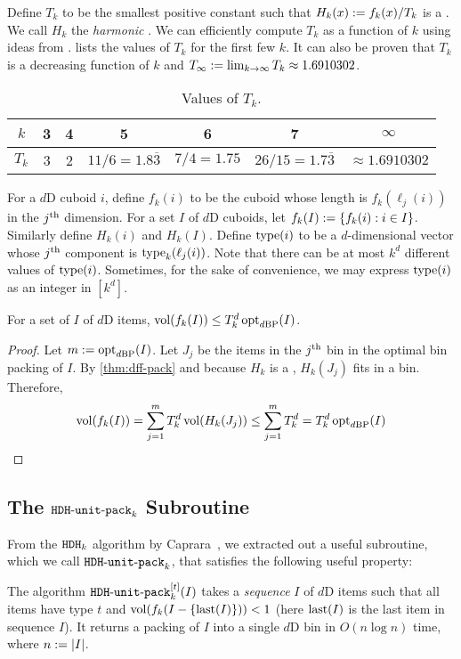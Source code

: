 Define $T_k$ to be the smallest positive constant such that
$H_k(x) := f_k(x)/T_k$ is a \dff{}. We call $H_k$ the \emph{harmonic \dff}.
We can efficiently compute $T_k$ as a function of $k$ using ideas from \cite{leelee,eku-harmonic}.
 lists the values of $T_k$ for the first few $k$.
It can also be proven that $T_k$ is a decreasing function of $k$
and $T_{\infty} := \lim_{k \to \infty} T_k \approx 1.6910302$.

\begin{table}[!ht]
\centering
\begin{tabular}{|c|c|c|c|c|c|c|}
\hline
$k$ & 3 & 4 & 5 & 6 & 7 & $\infty$ \\
\hline
$T_k$ & 3 & 2 & $11/6 = 1.8\overline{3}$ & $7/4 = 1.75$
& $26/15 = 1.7\overline{3}$ & $\approx 1.6910302$ \\
\hline
\end{tabular}
\caption{Values of $T_k$.}
\label{table:tk-values}
\end{table}

For a $d$D cuboid $i$, define $f_k(i)$ to be the cuboid
whose length is $f_k(\ell_j(i))$ in the $j^{\textrm{th}}$ dimension.
For a set $I$ of $d$D cuboids, let $f_k(I) := \{f_k(i): i \in I\}$.
Similarly define $H_k(i)$ and $H_k(I)$.
Define $\operatorname{type}(i)$ to be a $d$-dimensional vector whose $j^{\textrm{th}}$ component is $\operatorname{type}_k(\ell_j(i))$.
Note that there can be at most $k^d$ different values of $\operatorname{type}(i)$.
Sometimes, for the sake of convenience, we may express $\operatorname{type}(i)$ as an integer in $[k^d]$.

\begin{theorem}
\label{thm:fvol-bp}
For a set of $I$ of $d$D items, $\operatorname{vol}(f_k(I)) \le T_k^d \operatorname{opt}_{d\mathrm{BP}}(I)$.
\end{theorem}
\begin{proof}
Let $m := \operatorname{opt}_{d\mathrm{BP}}(I)$. Let $J_j$ be the items in the
$j^{\textrm{th}}$ bin in the optimal bin packing of $I$.
By \cref{thm:dff-pack} and because $H_k$ is a \dff{},
$H_k(J_j)$ fits in a bin. Therefore,
\[ \operatorname{vol}(f_k(I))
= \sum_{j=1}^m T_k^d \operatorname{vol}(H_k(J_j))
\le \sum_{j=1}^m T_k^d
= T_k^d \operatorname{opt}_{d\mathrm{BP}}(I)
\qedhere \]
\end{proof}

\subsection{The \texorpdfstring{$\operatorname{\mathtt{HDH-unit-pack}}_k$}{HDH-unit-pack} Subroutine}
\label{sec:hdhk-prelims:hdhkunit}

From the $\operatorname{\mathtt{HDH}}_{k}$ algorithm by Caprara~\cite{caprara2008},
we extracted out a useful subroutine, which we call $\operatorname{\mathtt{HDH-unit-pack}}_k$,
that satisfies the following useful property:
\begin{property}
\label{prop:hdhkunit}
The algorithm $\operatorname{\mathtt{HDH-unit-pack}}_k^{[t]}(I)$ takes a \emph{sequence} $I$ of $d$D items such that
all items have type $t$ and $\operatorname{vol}(f_k(I-\{\operatorname{last}(I)\})) < 1$
(here $\operatorname{last}(I)$ is the last item in sequence $I$).
It returns a packing of $I$ into a single $d$D bin
in $O(n\log n)$ time, where $n := |I|$.
\end{property}

